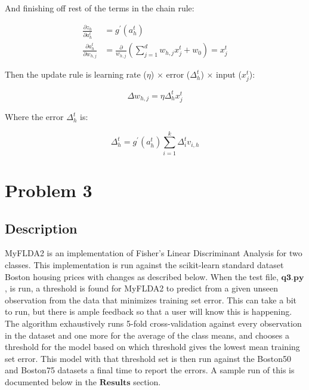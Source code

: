 \documentclass{article}
\begin{document}
And finishing off rest of the terms in the chain rule:

\begin{equation}
\begin{aligned}
\frac{\partial z_h} { \partial a_h^t } &= g^{'}(a_h^t) \\
\frac{ \partial a_h^t }{ \partial w_{h,j} } &= \frac{ \partial } { w_{h,j} } ( \sum\limits_{j=1}^d w_{h,j} x_j^t + w_0 ) = x_j^t
\end{aligned}
\end{equation}

Then the update rule is learning rate ($\eta$) $\times$ error ($\Delta_h^t$) $\times$ input ($x_j^t$):

\begin{equation}
\Delta w_{h,j} = \eta \Delta_h^t x_j^t
\end{equation}

Where the error $\Delta_h^t$ is:

\begin{equation}
\Delta_h^t = g^{'}(a_h^t) \sum_{i=1}^k \Delta_i^t v_{i,h}
\end{equation}


\section{Problem 3}

\subsection{Description}

MyFLDA2 is an implementation of Fisher's Linear Discriminant Analysis for two classes.  This implementation is run against the scikit-learn standard dataset Boston housing prices with changes as described below.  When the test file, $\textbf{q3.py}$, is run, a threshold is found for MyFLDA2 to predict from a given unseen observation from the data that minimizes training set error.  This can take a bit to run, but there is ample feedback so that a user will know this is happening.  The algorithm exhaustively runs 5-fold cross-validation against every observation in the dataset and one more for the average of the class means, and chooses a threshold for the model based on which threshold gives the lowest mean training set error.  This model with that threshold set is then run against the Boston50 and Boston75 datasets a final time to report the errors.  A sample run of this is documented below in the $\textbf{Results}$ section.
\end{document}
